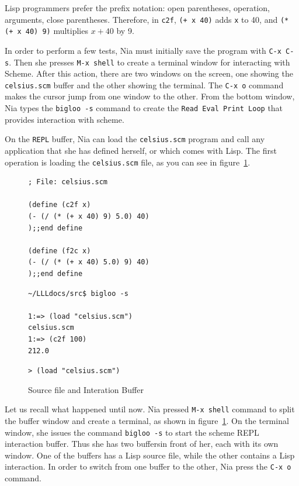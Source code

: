 \documentclass[a4paper,12pt]{book}
\newenvironment{fmpage}[1]
           {\begin{lrbox}{\fmbox}\begin{minipage}{#1}}
           {\end{minipage}\end{lrbox}\fbox{\usebox{\fmbox}}}
\begin{document}
Lisp programmers prefer the prefix notation:
open parentheses, operation, arguments, close parentheses.
Therefore, in  \verb|c2f|,  \verb|(+ x 40)|
adds \verb|x| to 40, and \verb|(* (+ x 40) 9)| multiplies $x+40$ by 9.

In order to perform a few tests, Nia must initially save
the program with \verb|C-x C-s|. Then she 
presses \verb|M-x shell| to create a terminal window
for interacting with Scheme. After this action, there are two
windows on the screen, one 
showing the \verb|celsius.scm| buffer and the other
showing the terminal. The \verb|C-x o| command
makes the cursor jump from one window to the other.
From the bottom window, Nia types the \verb|bigloo -s|
command to create the \verb|Read Eval Print Loop|
that provides interaction with scheme. 

On the \verb|REPL| buffer, 
Nia can load the \verb|celsius.scm| program
and  call any application that she has defined
herself, or which comes with Lisp.
The first operation is loading
the \verb|celsius.scm| file,
as you can see in figure~\ref{fig:repl}.


\begin{figure}[!b]
\begin{fmpage}{0.8\linewidth}
\begin{verbatim}
; File: celsius.scm

(define (c2f x)
(- (/ (* (+ x 40) 9) 5.0) 40)
);;end define

(define (f2c x)
(- (/ (* (+ x 40) 5.0) 9) 40)
);;end define
\end{verbatim}
\end{fmpage}

\begin{fmpage}{0.8\linewidth}
\begin{verbatim}
~/LLLdocs/src$ bigloo -s

1:=> (load "celsius.scm")
celsius.scm
1:=> (c2f 100)
212.0
\end{verbatim}
\end{fmpage}

\begin{fmpage}{0.8\linewidth}
\verb|> (load "celsius.scm")|
\end{fmpage}
\caption{Source file and Interation Buffer}
\label{fig:repl}
\end{figure}

Let us recall what happened until now.
Nia pressed \verb|M-x shell| command to split 
the buffer window and create a terminal, as shown
in figure~\ref{fig:repl}. On the terminal window,
she issues the command \verb|bigloo -s| to start
the scheme REPL interaction buffer. Thus she has
two buffersin front of her, each with its own window.
One of the buffers has a Lisp source file, while the other
contains a Lisp interaction. In order to  switch
from one buffer to the other,
Nia press the \verb|C-x o| command.
\end{document}
